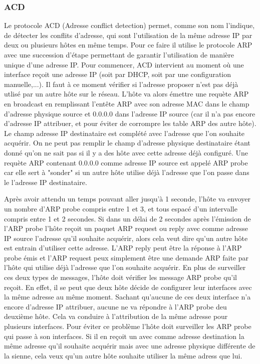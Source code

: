 \documentclass[twoside,openright,a4paper,11pt,french]{article}
\begin{document}
\subsubsection{ACD}
Le protocole ACD (Adresse conflict detection) permet, comme son nom l'indique, de détecter les conflits d'adresse, qui sont l'utilisation de la même adresse IP par deux ou plusieurs hôtes en même temps.
Pour ce faire il utilise le protocole ARP avec une succession d'étape permettant de garantir l'utilisation de manière unique d'une adresse IP.
Pour commencer, ACD intervient au moment où une interface reçoit une adresse IP (soit par DHCP, soit par une configuration manuelle,...). Il faut à ce moment vérifier si l'adresse proposer n'est pas déjà utlisé par un autre hôte sur le réseau.
L'hôte va alors émettre une requète ARP en broadcast en remplissant l'entête ARP avec son adresse MAC dans le champ d'adresse physique source et 0.0.0.0 dans l'adresse IP source (car il n'a pas encore d'adresse IP attribuer, et pour éviter de corrompre les table ARP des autre hôte). Le champ adresse IP destinataire est complété avec l'adresse que l'on souhaite acquérir. On ne peut pas remplir le champ d'adresse physique destinataire étant donné qu'on ne sait pas si il y a des hôte avec cette adresse déjà configuré.
Une requète ARP contenant 0.0.0.0 comme adresse IP source est appelé ARP probe car elle sert à "sonder" si un autre hôte utilise déjà l'adresse que l'on passe dans le l'adresse IP destinataire.

Après avoir attendu un temps pouvant aller jusqu'à 1 seconde, l'hôte va envoyer un nombre d'ARP probe compris entre 1 et 3, et tous espacé d'un intervalle compris entre 1 et 2 secondes.
Si dans un délai de 2 secondes après l'émission de l'ARP probe l'hôte reçoit un paquet ARP request ou reply avec comme adresse IP source l'adresse qu'il souhaite acquérir, alors cela veut dire qu'un autre hôte est entrain d'utiliser cette adresse. L'ARP reply peut être la réponse à l'ARP probe émis et l'ARP request peux simplement être une demande ARP faite par l'hôte qui utilise déjà l'adresse que l'on souhaite acquérir.
En plus de surveiller ces deux types de messages, l'hôte doit vérifier les message ARP probe qu'il reçoit. En effet, il se peut que deux hôte décide de configurer leur interfaces avec la même adresse au même moment. Sachant qu'aucune de ces deux interface n'a encore d'adresse IP attribuer, aucune ne va répondre à l'ARP probe deu deuxième hôte. Cela va conduire à l'attribution de la même adresse pour plusieurs interfaces. Pour éviter ce problème l'hôte doit surveiller les ARP probe qui passe à son interfaces. Si il en reçoit un avec comme adresse destination la même adresse qu'il souhaite acquérir mais avec une adresse physique différente de la sienne, cela veux qu'un autre hôte souhaite utiliser la même adress que lui.
\end{document}
